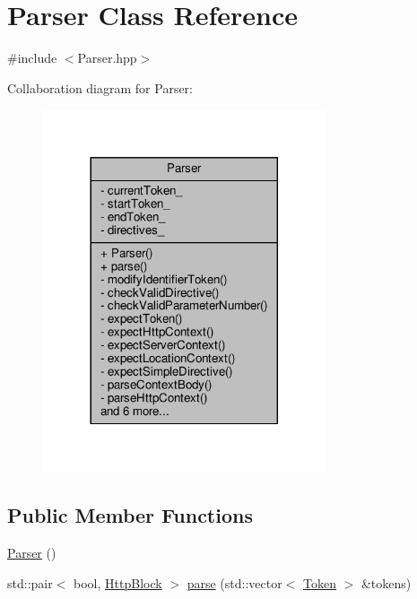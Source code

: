 \hypertarget{classft_1_1_parser}{}\section{Parser Class Reference}
\label{classft_1_1_parser}


{\ttfamily \#include $<$Parser.\+hpp$>$}



Collaboration diagram for Parser\+:
\nopagebreak
\begin{figure}[H]
\begin{center}
\leavevmode
\includegraphics[width=236pt]{classft_1_1_parser__coll__graph}
\end{center}
\end{figure}
\subsection*{Public Member Functions}
\begin{DoxyCompactItemize}
\item 
\hyperlink{classft_1_1_parser_a6bfb42ee628e026bebda9adb7ae8b895}{Parser} ()
\item 
std\+::pair$<$ bool, \hyperlink{classft_1_1_http_block}{Http\+Block} $>$ \hyperlink{classft_1_1_parser_ace9c91f641d6eb5467ce89798679b248}{parse} (std\+::vector$<$ \hyperlink{classft_1_1_token}{Token} $>$ \&tokens)
\end{DoxyCompactItemize}

